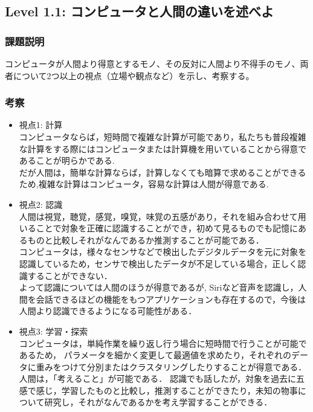 \subsection{Level 1.1: コンピュータと人間の違いを述べよ}
\subsubsection{課題説明}
コンピュータが人間より得意とするモノ、その反対に人間より不得手のモノ、両者について2つ以上の視点（立場や観点など）を示し、考察する。

\subsubsection{考察}
\begin{itemize}
 \item 視点1: 計算\\
	コンピュータならば，短時間で複雑な計算が可能であり，私たちも普段複雑な計算をする際にはコンピュータまたは計算機を用いていることから得意であることが明らかである.\\
	だが人間は，簡単な計算ならば，計算しなくても暗算で求めることができるため,複雑な計算はコンピュータ，容易な計算は人間が得意である. 

 \item 視点2: 認識\\
	人間は視覚，聴覚，感覚，嗅覚，味覚の五感があり，それを組み合わせて用いることで対象を正確に認識することができ，初めて見るものでも記憶にあるものと比較しそれがなんであるか推測することが可能である．\\
	コンピュータは，様々なセンサなどで検出したデジタルデータを元に対象を認識しているため，センサで検出したデータが不足している場合，正しく認識することができない．\\
よって認識については人間のほうが得意であるが,  
Siriなど音声を認識し，人間を会話できるほどの機能をもつアプリケーションも存在するので，今後は人間より認識できるようになる可能性がある．  

 \item 視点3: 学習・探索\\
	コンピュータは，単純作業を繰り返し行う場合に短時間で行うことが可能であるため，
パラメータを細かく変更して最適値を求めたり，それぞれのデータに重みをつけて分別またはクラスタリングしたりすることが得意である．\\
	人間は，「考えること」が可能である．
認識でも話したが，対象を過去に五感で感じ，学習したものと比較し，推測することができたり，未知の物事について研究し，それがなんであるかを考え学習することができる．


\end{itemize}
